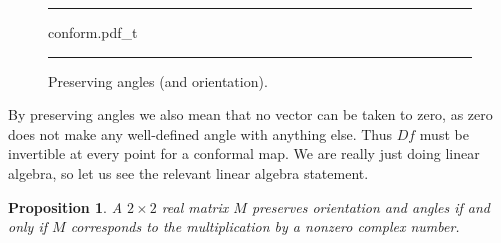 \documentclass[12pt,openany]{book}
\theoremstyle{plain}
\newtheorem{prop}[thm]{Proposition}
\theoremstyle{remark}
\theoremstyle{definition}
\newenvironment{myfig}{%
\begin{figure}[h!t]
\noindent\rule{\textwidth}{0.5pt}\vspace{12pt}\par\centering}%
{\par\noindent\rule{\textwidth}{0.5pt}
\end{figure}}
\theoremstyle{exercise}
\theoremstyle{example}
\begin{document}
\begin{myfig}
{conform.pdf_t}
\caption{Preserving angles (and orientation).\label{fig:conform}}
\end{myfig}

By preserving angles we also mean that no vector can be taken to zero,
as zero does not make any well-defined angle with anything else.
Thus $Df$ must be invertible at every point for a conformal map.
We are really just doing linear algebra, so let us see the relevant
linear algebra statement.

\begin{prop}
A $2\times 2$ real matrix $M$
preserves orientation and angles
if and only if $M$ corresponds to the multiplication by a nonzero
complex number.
\end{prop}
\end{document}
